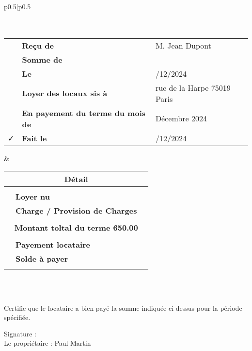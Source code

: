 \documentclass{article}
\begin{document}
\begin{tabular}{p{}|p{}}
	\hline 	
	\\
		\\
	\hline 
	\\
	\begin{tabular}{c>{\raggedleft\arraybackslash}p{}>{\raggedright\arraybackslash}p{}}
		\faFile{} &  \textbf{Reçu de} & M. Jean Dupont\\
		\faMoney & 	\textbf{Somme de}	 & 650.00 \EURdig\\
		\faCalendar & \textbf{Le} & 02/12/2024\\
		\faMapMarker & \textbf{Loyer des locaux sis à } & 6 rue de la Harpe 75019 Paris\\
		\faPencil & \textbf{En payement du terme du mois de} & Décembre 2024\\
		\faCheck & \textbf{Fait le} & 05/12/2024\\
	\end{tabular}
	& \setlength{\arrayrulewidth}{2pt} %
	\begin{tabular}{c>{\raggedleft\arraybackslash}p{}>{\raggedright\arraybackslash}p{}}	
		\multicolumn{3}{c}{\bf Détail}\\
		\hline \\
		\faHome{} & \textbf{Loyer nu} & 580.0 \EURdig	\\
		\faBolt{} & \textbf{Charge / Provision de Charges} &  70.0 \EURdig	\\
		\\
		\multicolumn{3}{c}{\bf Montant toltal du terme 650.00 \EURdig }\\
		\hline \\
		\faMoney{} & \textbf{Payement locataire} & 600.00 \EURdig	\\
		\faExclamationTriangle{} & \textbf{Solde à payer} &  50.00 \EURdig	\\
		&\\
	\end{tabular}\\
	\hline
    \\
    \hline
\end{tabular}






\vspace{1cm}

\noindent
Certifie que le locataire a bien payé la somme indiquée ci-dessus pour la période spécifiée.

\vspace{2cm}

\noindent
Signature : \\
Le propriétaire : Paul Martin
\end{document}
